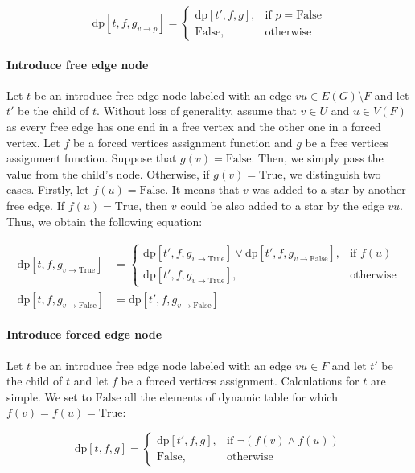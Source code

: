\documentclass[en]{pracamgr}
\theoremstyle{definition}
\newcommand{\dpt}[1]{\textrm{dp}[#1]}
\newcommand{\true}{\textrm{True}}
\newcommand{\false}{\textrm{False}}
\begin{document}
\begin{equation*}
	\dpt{t,f,g_{v \rightarrow p}} =
	\begin{cases}
		\dpt{t',f,g}, & \text{if $p=\false$} \\
		\false, &\text{otherwise}
	\end{cases}
\end{equation*}

\paragraph{Introduce free edge node} Let $t$ be an introduce free edge node labeled with an edge $vu \in E(G) \setminus F$ and let $t'$ be the child of $t$. Without loss of generality, assume that $v \in U$ and $u \in V(F)$ as every free edge has one end in a free vertex and the other one in a forced vertex. Let $f$ be a forced vertices assignment function and $g$ be a free vertices assignment function. Suppose that $g(v)=\false$. Then, we simply pass the value from the child's node. Otherwise, if $g(v)=\true$, we distinguish two cases. Firstly, let $f(u)=\false$. It means that $v$ was added to a star by another free edge. If $f(u)=\true$, then $v$ could be also added to a star by the edge $vu$. Thus, we obtain the following equation: 

\begin{equation*}
\begin{split}
	\dpt{t,f,g_{v \rightarrow \true}} & = 
		\begin{cases}
			\dpt{t',f,g_{v \rightarrow \true}} \lor \dpt{t',f,g_{v \rightarrow \false}}, & \text{if $f(u)$} \\
			\dpt{t',f,g_{v \rightarrow \true}}, & \text{otherwise}
		\end{cases}	
	\\
	\dpt{t,f,g_{v \rightarrow \false}} & = \dpt{t',f,g_{v \rightarrow \false}}\end{split}
\end{equation*}

\paragraph{Introduce forced edge node} Let $t$ be an introduce free edge node labeled with an edge $vu \in F$ and let $t'$ be the child of $t$ and let $f$ be a forced vertices assignment. Calculations for $t$ are simple. We set to $\false$ all the elements of dynamic table for which $f(v)=f(u)=\true$:

\begin{equation*}
	\dpt{t,f,g} =
	\begin{cases}
		\dpt{t',f,g}, & \text{if $\neg(f(v) \land f(u))$} \\
		\false, & \text{otherwise}
	\end{cases}
\end{equation*}
\end{document}
